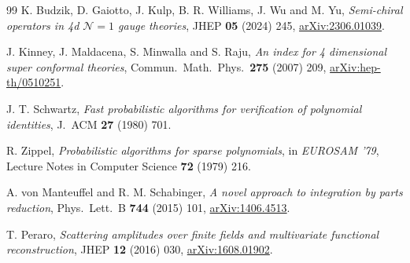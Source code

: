 \documentclass[11pt]{article}
\newcommand{\cN}{\mathcal{N}}
\newcommand{\arxiv}[1]{\href{https://arxiv.org/abs/#1}{arXiv:#1}}
\begin{document}
\begin{thebibliography}{99}
 K. Budzik, D. Gaiotto, J. Kulp, B. R. Williams, J. Wu and M. Yu, \emph{Semi-chiral operators in 4d
$\cN=1$ gauge theories}, JHEP \textbf{05} (2024) 245, \arxiv{2306.01039}.

 J. Kinney, J. Maldacena, S. Minwalla and S. Raju, \emph{An index for 4 dimensional super conformal
theories}, Commun.\ Math.\ Phys.\ \textbf{275} (2007) 209, \arxiv{hep-th/0510251}.

 J. T. Schwartz, \emph{Fast probabilistic algorithms for verification of polynomial identities},
J.\ ACM \textbf{27} (1980) 701.

 R. Zippel, \emph{Probabilistic algorithms for sparse polynomials}, in \emph{EUROSAM '79}, Lecture Notes
in Computer Science \textbf{72} (1979) 216.

 A. von Manteuffel and R. M. Schabinger, \emph{A novel approach to integration by parts reduction},
Phys.\ Lett.\ B \textbf{744} (2015) 101, \arxiv{1406.4513}.

 T. Peraro, \emph{Scattering amplitudes over finite fields and multivariate functional
reconstruction}, JHEP \textbf{12} (2016) 030, \arxiv{1608.01902}.

\end{thebibliography}
\end{document}
